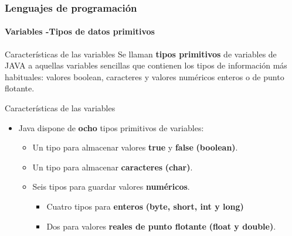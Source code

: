 \documentclass{beamer}
\begin{document}
\begin{frame}
  \frametitle{Lenguajes de programación}
  \framesubtitle{Variables -Tipos de datos primitivos}

  \begin{exampleblock}{Características de las variables}
    Se llaman \textbf{tipos primitivos} de variables de JAVA a aquellas variables sencillas que contienen los tipos de información más habituales: valores boolean, caracteres y valores numéricos enteros o de punto flotante. 
  \end{exampleblock}
  
  \begin{block}{Características de las variables}
    \begin{itemize}
    \item Java dispone de \textbf{ocho} tipos primitivos de variables:
      \begin{itemize}
      \item Un tipo para almacenar valores \textbf{true} y  \textbf{false}  \textbf{(boolean)}.
      \item Un tipo para almacenar \textbf{caracteres}  \textbf{(char)}.
      \item Seis tipos para guardar valores \textbf{numéricos}.
        \begin{itemize}
        \item Cuatro tipos para \textbf{enteros} \textbf{(byte, short, int y long)}
        \item Dos para valores \textbf{reales de punto flotante} \textbf{(float y double)}.
        \end{itemize}
      \end{itemize}
    \end{itemize}
  \end{block}
\end{frame}
\end{document}
